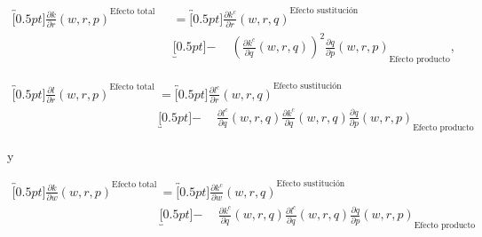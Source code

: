 \documentclass[8pt,a4paper]{extarticle}
\begin{document}
\begin{multicols}{3}
\begin{boxtheo}
		\begin{equation*}
			\begin{aligned}
				\overbracket[0.5pt]{\frac{\partial k}{\partial r} (w, r, p)}^{\text{Efecto total}} \quad & = \overbracket[0.5pt]{\frac{\partial k^c}{\partial r} (w, r, q)}^{\text{Efecto sustitución}}                                                               \\
				                                                                                         & \underbracket[0.5pt]{ - \quad\ \left( \frac{\partial k^c}{\partial q} (w,r,q) \right)^2 \frac{\partial q}{\partial p} (w, r, p)}_{\text{Efecto producto}},
			\end{aligned}
		\end{equation*}

		\begin{equation*}
			\begin{aligned}
				\overbracket[0.5pt]{\frac{\partial l}{\partial r} (w, r, p)}^{\text{Efecto total}} \quad & = \overbracket[0.5pt]{\frac{\partial l^c}{\partial r} (w, r, q)}^{\text{Efecto sustitución}}                                                                                         \\
				                                                                                         & \underbracket[0.5pt]{ - \quad\ \frac{\partial l^c}{\partial q} (w ,r, q) \frac{\partial k^c}{\partial q} (w, r, q) \frac{\partial q}{\partial p} (w, r, p)}_{\text{Efecto producto}}
			\end{aligned}
		\end{equation*}

		y

		\begin{equation*}
			\begin{aligned}
				\overbracket[0.5pt]{\frac{\partial k}{\partial w} (w, r, p)}^{\text{Efecto total}} \quad & = \overbracket[0.5pt]{\frac{\partial k^c}{\partial w} (w, r, q)}^{\text{Efecto sustitución}}                                                                                         \\
				                                                                                         & \underbracket[0.5pt]{ - \quad\ \frac{\partial k^c}{\partial q} (w ,r, q) \frac{\partial l^c}{\partial q} (w, r, q) \frac{\partial q}{\partial p} (w, r, p)}_{\text{Efecto producto}}
			\end{aligned}
		\end{equation*}

	\end{boxtheo}

	\vfill\eject
	\columnbreak
\end{multicols}
\end{document}
